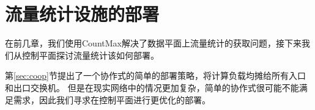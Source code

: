 \chapter{流量统计设施的部署}
在前几章，我们使用CountMax解决了数据平面上流量统计的获取问题，接下来我们从控制平面探讨流量统计该如何部署。

第\ref{sec:coop}节提出了一个协作式的简单的部署策略，将计算负载均摊给所有入口和出口交换机。
但是在现实网络中的情况更加复杂，简单的协作式很可能不能满足需求，因此我们寻求在控制平面进行更优化的部署。